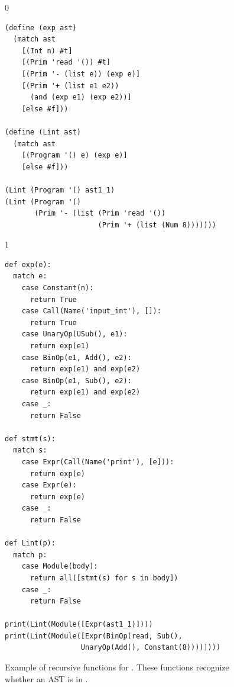\documentclass[7x10]{TimesAPriori_MIT}%
\def\racketEd{0}
\def\pythonEd{1}
\def\edition{1}
\begin{document}
\begin{figure}[tp]
{\if\edition\racketEd
\begin{lstlisting}
(define (exp ast)
  (match ast
    [(Int n) #t]
    [(Prim 'read '()) #t]
    [(Prim '- (list e)) (exp e)]
    [(Prim '+ (list e1 e2))
      (and (exp e1) (exp e2))]
    [else #f]))

(define (Lint ast)
  (match ast
    [(Program '() e) (exp e)]
    [else #f]))

(Lint (Program '() ast1_1)
(Lint (Program '()
       (Prim '- (list (Prim 'read '())
                      (Prim '+ (list (Num 8)))))))
\end{lstlisting}
\fi}
{\if\edition\pythonEd
\begin{lstlisting}
def exp(e):
  match e:
    case Constant(n):
      return True
    case Call(Name('input_int'), []):
      return True
    case UnaryOp(USub(), e1):
      return exp(e1)
    case BinOp(e1, Add(), e2):
      return exp(e1) and exp(e2)
    case BinOp(e1, Sub(), e2):
      return exp(e1) and exp(e2)
    case _:
      return False

def stmt(s):
  match s:
    case Expr(Call(Name('print'), [e])):
      return exp(e)
    case Expr(e):
      return exp(e)
    case _:
      return False
  
def Lint(p):
  match p:
    case Module(body):
      return all([stmt(s) for s in body])
    case _:
      return False

print(Lint(Module([Expr(ast1_1)])))
print(Lint(Module([Expr(BinOp(read, Sub(),
                  UnaryOp(Add(), Constant(8))))])))
\end{lstlisting}
\fi}

\caption{Example of recursive functions for \LangInt{}. These functions
  recognize whether an AST is in \LangInt{}.}
\label{fig:exp-predicate}
\end{figure}


\end{document}
